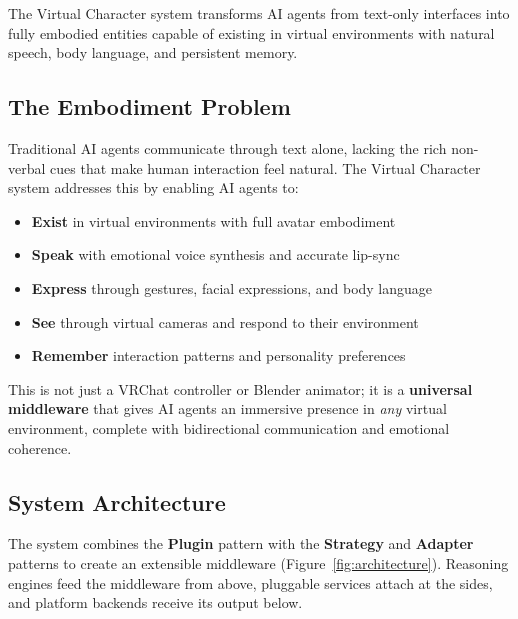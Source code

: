 \documentclass[11pt,letterpaper]{article}
\begin{document}
\begin{tldrbox}
The Virtual Character system transforms AI agents from text-only interfaces into fully embodied entities capable of existing in virtual environments with natural speech, body language, and persistent memory.
\end{tldrbox}

\subsection{The Embodiment Problem}

Traditional AI agents communicate through text alone, lacking the rich non-verbal cues that make human interaction feel natural. The Virtual Character system addresses this by enabling AI agents to:

\begin{itemize}
  \item \textbf{Exist} in virtual environments with full avatar embodiment
  \item \textbf{Speak} with emotional voice synthesis and accurate lip-sync
  \item \textbf{Express} through gestures, facial expressions, and body language
  \item \textbf{See} through virtual cameras and respond to their environment
  \item \textbf{Remember} interaction patterns and personality preferences
\end{itemize}

\begin{keybox}
This is not just a VRChat controller or Blender animator; it is a \textbf{universal middleware} that gives AI agents an immersive presence in \emph{any} virtual environment, complete with bidirectional communication and emotional coherence.
\end{keybox}

\subsection{System Architecture}

The system combines the \textbf{Plugin} pattern with the \textbf{Strategy} and \textbf{Adapter} patterns to create an extensible middleware (Figure~\ref{fig:architecture}). Reasoning engines feed the middleware from above, pluggable services attach at the sides, and platform backends receive its output below.
\end{document}
